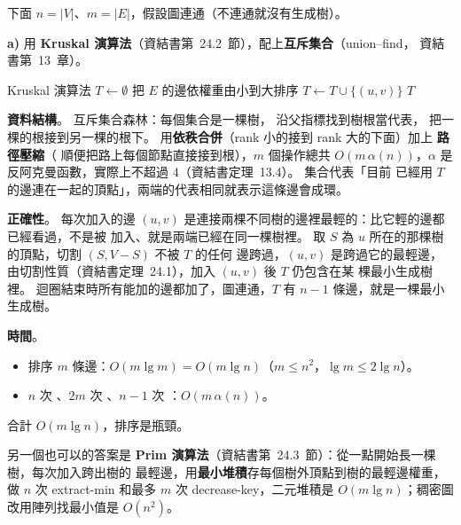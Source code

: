 \begin{pastsoln}
下面 $n = |V|$、$m = |E|$，假設圖連通（不連通就沒有生成樹）。

\textbf{a)} 用 \textbf{Kruskal 演算法}（資結書第~24.2~節），配上\textbf{互斥集合}（union--find，
資結書第~13~章）。

\begin{pseudo}{Kruskal 演算法}
    \State $T \gets \emptyset$
        \State {}
    \EndFor
    \State 把 $E$ 的邊依權重由小到大排序
         
            \State $T \gets T \cup \{(u, v)\}$
            \State {}
        \EndIf
    \EndFor
    \State \Return $T$
\EndFunction
\end{pseudo}

\textbf{資料結構}。 互斥集合森林：每個集合是一棵樹， 沿父指標找到樹根當代表，
 把一棵的根接到另一棵的根下。 用\textbf{依秩合併}（rank 小的接到 rank 大的下面）加上
\textbf{路徑壓縮}（ 順便把路上每個節點直接接到根），$m$ 個操作總共
$O(m\,\alpha(n))$，$\alpha$ 是反阿克曼函數，實際上不超過 $4$（資結書定理~13.4）。 集合代表「目前
已經用 $T$ 的邊連在一起的頂點」，兩端的代表相同就表示這條邊會成環。

\textbf{正確性}。 每次加入的邊 $(u, v)$ 是連接兩棵不同樹的邊裡最輕的：比它輕的邊都已經看過，不是被
加入、就是兩端已經在同一棵樹裡。 取 $S$ 為 $u$ 所在的那棵樹的頂點，切割 $(S, V - S)$ 不被 $T$ 的任何
邊跨過，$(u, v)$ 是跨過它的最輕邊，由切割性質（資結書定理~24.1），加入 $(u, v)$ 後 $T$ 仍包含在某
棵最小生成樹裡。 迴圈結束時所有能加的邊都加了，圖連通，$T$ 有 $n - 1$ 條邊，就是一棵最小生成樹。

\textbf{時間}。
\begin{itemize}
\item 排序 $m$ 條邊：$O(m \lg m) = O(m \lg n)$（$m \le n^2$，$\lg m \le 2 \lg n$）。
\item $n$ 次 、$2m$ 次 、$n - 1$ 次 ：$O(m\,\alpha(n))$。
\end{itemize}
合計 $O(m \lg n)$，排序是瓶頸。

另一個也可以的答案是 \textbf{Prim 演算法}（資結書第~24.3~節）：從一點開始長一棵樹，每次加入跨出樹的
最輕邊，用\textbf{最小堆積}存每個樹外頂點到樹的最輕邊權重，做 $n$ 次 extract-min 和最多 $m$ 次
decrease-key，二元堆積是 $O(m \lg n)$；稠密圖改用陣列找最小值是 $O(n^2)$。


\end{pastsoln}
